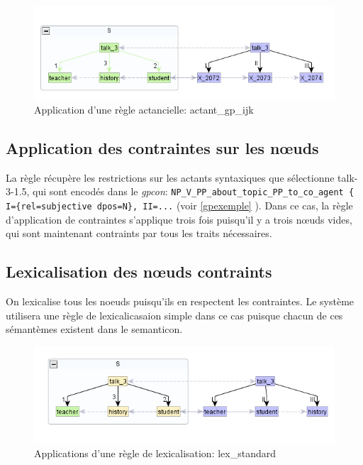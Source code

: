 \begin{figure}[htb]
	\centering
	\includegraphics[width=1\textwidth, trim = {0cm 0cm 0cm 0cm},clip]{ch6/figs/actant_gp_ijk.png}
	\caption{Application d'une règle actancielle: actant\_gp\_ijk}
	\label{deroulement2}
\end{figure}

\subsection{Application des contraintes sur les n\oe{}uds}
La règle récupère les restrictions sur les actants syntaxiques que sélectionne talk-3-1.5, qui sont encodés dans le \emph{gpcon}: \lstinline|NP_V_PP_about_topic_PP_to_co_agent { I={rel=subjective dpos=N}, II=...| (voir \ref{gpexemple} ). Dans ce cas, la règle d'application de contraintes s'applique trois fois puisqu'il y a trois n\oe{}uds vides, qui sont maintenant contraints par tous les traits nécessaires.

\subsection{Lexicalisation des n\oe{}uds contraints}
On lexicalise tous les noeuds puisqu'ils en respectent les contraintes. Le système utilisera une règle de lexicalicasaion simple dans ce cas puisque chacun de ces sémantèmes existent dans le semanticon.

\begin{figure}[htb]
	\centering
	\includegraphics[width=1\textwidth, trim = {0cm 0cm 0cm 0cm},clip]{ch6/figs/lex.png}
	\caption{Applications d'une règle de lexicalisation: lex\_standard}
	\label{deroulement3}
\end{figure}

